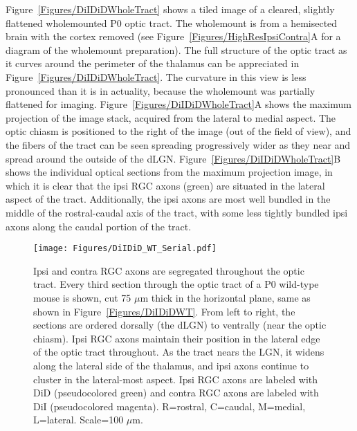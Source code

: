 Figure~\ref{Figures/DiIDiDWholeTract} shows a tiled image of a cleared, slightly flattened wholemounted P0 optic tract.
The wholemount is from a hemisected brain with the cortex removed (see Figure~\ref{Figures/HighResIpsiContra}A for a diagram of the wholemount preparation).
The full structure of the optic tract as it curves around the perimeter of the thalamus can be appreciated in Figure~\ref{Figures/DiIDiDWholeTract}.
The curvature in this view is less pronounced than it is in actuality, because the wholemount was partially flattened for imaging.
Figure~\ref{Figures/DiIDiDWholeTract}A shows the maximum projection of the image stack, acquired from the lateral to medial aspect.
The optic chiasm is positioned to the right of the image (out of the field of view), and the fibers of the tract can be seen spreading progressively wider as they near and spread around the outside of the dLGN.
Figure~\ref{Figures/DiIDiDWholeTract}B shows the individual optical sections from the maximum projection image, in which it is clear that the ipsi RGC axons (green) are situated in the lateral aspect of the tract.
Additionally, the ipsi axons are most well bundled in the middle of the rostral-caudal axis of the tract, with some less tightly bundled ipsi axons along the caudal portion of the tract.
\begin{figure}[hbtp]
    \begin{center}
        \texttt{[image: Figures/DiIDiD\_WT\_Serial.pdf]}
        \caption[Ipsi and contra RGC axons are segregated throughout the optic tract.]
        {Ipsi and contra RGC axons are segregated throughout the optic tract.
        Every third section through the optic tract of a P0 wild-type mouse is shown, cut 75 $\mu$m thick in the horizontal plane, same as shown in Figure~\ref{Figures/DiIDiDWT}.
		From left to right, the sections are ordered dorsally (the dLGN) to ventrally (near the optic chiasm).
		Ipsi RGC axons maintain their position in the lateral edge of the optic tract throughout.
        As the tract nears the LGN, it widens along the lateral side of the thalamus, and ipsi axons continue to cluster in the lateral-most aspect.
        Ipsi RGC axons are labeled with DiD (pseudocolored green) and contra RGC axons are labeled with DiI (pseudocolored magenta).
        R=rostral, C=caudal, M=medial, L=lateral.
        Scale=100 $\mu$m.}
        \label{Figures/DiIDiDWTSerial}
    \end{center}
\end{figure}
